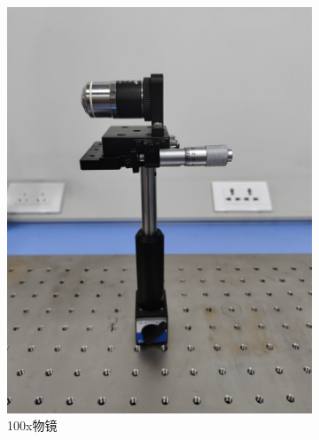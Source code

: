 \documentclass[a4paper]{report} %
\begin{document}
\begin{figure}[htbp]
    \begin{subfigure}{0.22\textwidth}
        \includegraphics[width=\linewidth]{100x物镜.jpg}
        \caption{100x物镜}
    \end{subfigure}
    \begin{subfigure}{0.22\textwidth}

\end{subfigure}
\end{figure}
\end{document}
